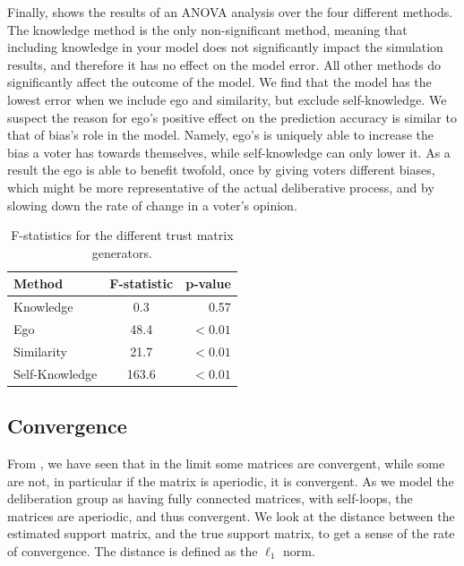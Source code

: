 Finally,  shows the results of an ANOVA analysis over the
four different methods. The knowledge method is the only non-significant
method, meaning that including knowledge in your model does not significantly
impact the simulation results, and therefore it has no effect on the model
error. All other methods do significantly affect the outcome of the model. We
find that the model has the lowest error when we include ego and similarity,
but exclude self-knowledge. We suspect the reason for ego's positive effect on
the prediction accuracy is similar to that of bias's role in the model. Namely,
ego's is uniquely able to increase the bias a voter has towards themselves,
while self-knowledge can only lower it. As a result the ego is able to benefit
twofold, once by giving voters different biases, which might be more
representative of the actual deliberative process, and by slowing down the rate
of change in a voter's opinion.


\begin{table}
	\caption{F-statistics for the different trust matrix generators.}\label{tab:anova_trust}
	\begin{center}
		\begin{tabular}[c]{lcr}
			\toprule
			Method         & F-statistic & p-value  \\
			\hline
			Knowledge      & 0.3         & 0.57     \\
			Ego            & 48.4        & $<0.01$  \\
			Similarity     & 21.7        & $< 0.01$ \\
			Self-Knowledge & 163.6       & $ <0.01$ \\

			\bottomrule
		\end{tabular}
	\end{center}
\end{table}

\subsection{Convergence}

From , we have seen that in the limit some matrices are
convergent, while some are not, in particular if the matrix is aperiodic, it
is convergent. As we model the deliberation group as having fully connected
matrices, with self-loops, the matrices are aperiodic, and thus convergent. We look at the
distance between the estimated support matrix, and the true support matrix, to
get a sense of the rate of convergence. The distance is defined as the
$\ell_1$ norm.

